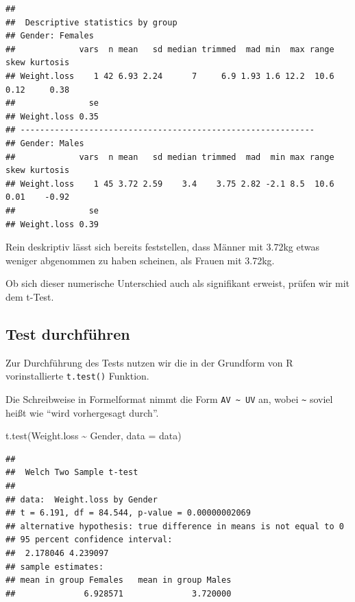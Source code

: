 \documentclass[
]{book}
\newenvironment{Shaded}{\begin{snugshade}}{\end{snugshade}}
\newcommand{\AttributeTok}[1]{\textcolor[rgb]{0.77,0.63,0.00}{#1}}
\newcommand{\FunctionTok}[1]{\textcolor[rgb]{0.00,0.00,0.00}{#1}}
\newcommand{\NormalTok}[1]{#1}
\newcommand{\SpecialCharTok}[1]{\textcolor[rgb]{0.00,0.00,0.00}{#1}}
\begin{document}
\begin{verbatim}
## 
##  Descriptive statistics by group 
## Gender: Females
##             vars  n mean   sd median trimmed  mad min  max range skew kurtosis
## Weight.loss    1 42 6.93 2.24      7     6.9 1.93 1.6 12.2  10.6 0.12     0.38
##               se
## Weight.loss 0.35
## ------------------------------------------------------------ 
## Gender: Males
##             vars  n mean   sd median trimmed  mad  min max range skew kurtosis
## Weight.loss    1 45 3.72 2.59    3.4    3.75 2.82 -2.1 8.5  10.6 0.01    -0.92
##               se
## Weight.loss 0.39
\end{verbatim}

Rein deskriptiv lässt sich bereits feststellen, dass Männer mit 3.72kg etwas weniger abgenommen zu haben scheinen, als Frauen mit 3.72kg.

Ob sich dieser numerische Unterschied auch als signifikant erweist, prüfen wir mit dem t-Test.

\hypertarget{test-durchfuxfchren-1}{%
\subsection{Test durchführen}\label{test-durchfuxfchren-1}}

Zur Durchführung des Tests nutzen wir die in der Grundform von R vorinstallierte \texttt{t.test()} Funktion.

Die Schreibweise in Formelformat nimmt die Form \texttt{AV\ \textasciitilde{}\ UV} an, wobei \texttt{\textasciitilde{}} soviel heißt wie ``wird vorhergesagt durch''.

\begin{Shaded}
\begin{Highlighting}[]
\FunctionTok{t.test}\NormalTok{(Weight.loss }\SpecialCharTok{\textasciitilde{}}\NormalTok{ Gender, }\AttributeTok{data =}\NormalTok{ data)}
\end{Highlighting}
\end{Shaded}

\begin{verbatim}
## 
##  Welch Two Sample t-test
## 
## data:  Weight.loss by Gender
## t = 6.191, df = 84.544, p-value = 0.00000002069
## alternative hypothesis: true difference in means is not equal to 0
## 95 percent confidence interval:
##  2.178046 4.239097
## sample estimates:
## mean in group Females   mean in group Males 
##              6.928571              3.720000
\end{verbatim}
\end{document}
